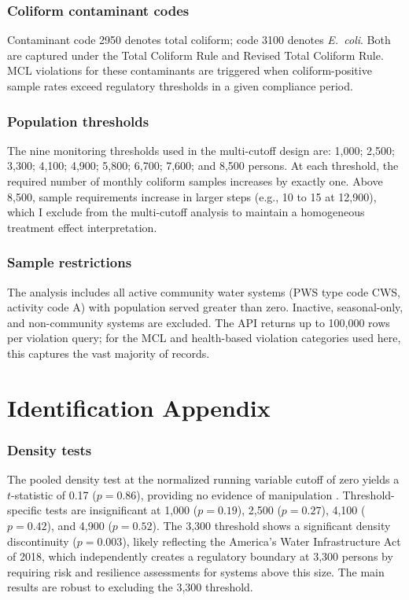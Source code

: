 \documentclass[12pt]{article}
\begin{document}
\subsubsection*{Coliform contaminant codes} Contaminant code 2950 denotes total coliform; code 3100 denotes \textit{E.~coli}. Both are captured under the Total Coliform Rule and Revised Total Coliform Rule. MCL violations for these contaminants are triggered when coliform-positive sample rates exceed regulatory thresholds in a given compliance period.

\subsubsection*{Population thresholds} The nine monitoring thresholds used in the multi-cutoff design are: 1,000; 2,500; 3,300; 4,100; 4,900; 5,800; 6,700; 7,600; and 8,500 persons. At each threshold, the required number of monthly coliform samples increases by exactly one. Above 8,500, sample requirements increase in larger steps (e.g., 10 to 15 at 12,900), which I exclude from the multi-cutoff analysis to maintain a homogeneous treatment effect interpretation.

\subsubsection*{Sample restrictions} The analysis includes all active community water systems (PWS type code CWS, activity code A) with population served greater than zero. Inactive, seasonal-only, and non-community systems are excluded. The API returns up to 100,000 rows per violation query; for the MCL and health-based violation categories used here, this captures the vast majority of records.


\section{Identification Appendix}
\label{app:id}

\subsubsection*{Density tests} The pooled density test at the normalized running variable cutoff of zero yields a $t$-statistic of 0.17 ($p = 0.86$), providing no evidence of manipulation \citep{cattaneo2020simple}. Threshold-specific tests are insignificant at 1,000 ($p = 0.19$), 2,500 ($p = 0.27$), 4,100 ($p = 0.42$), and 4,900 ($p = 0.52$). The 3,300 threshold shows a significant density discontinuity ($p = 0.003$), likely reflecting the America's Water Infrastructure Act of 2018, which independently creates a regulatory boundary at 3,300 persons by requiring risk and resilience assessments for systems above this size. The main results are robust to excluding the 3,300 threshold.
\end{document}
